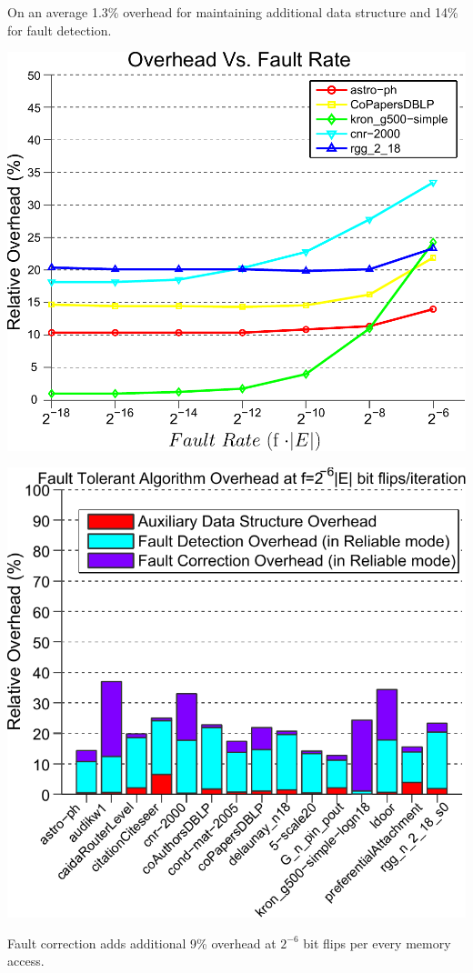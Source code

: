 \color{dpg} On an average 1.3\% overhead for maintaining additional data structure and 14\%
for fault detection.
\lyxframeend{}

\centering
\includegraphics[height=.75\textheight]{plots/plot_overhead_fault-inked}



\lyxframeend{}

\centering
\includegraphics[height=.75\textheight]{plots/plot_overhead_2e6}

\color{dpg} Fault correction adds additional 9\% overhead at $2^{-6}$ bit flips per every memory access. 

\lyxframeend{}